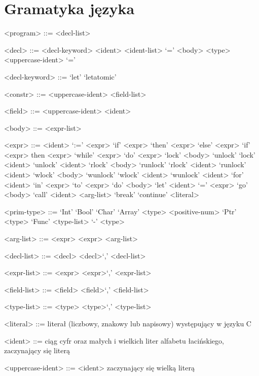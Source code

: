 \documentclass{documentation}
\begin{document}
\section{Gramatyka języka}
\begin{grammar}

<program> ::= <decl-list>

<decl> ::= <decl-keyword> <ident> <ident-list> `=' <body>
\alt <type> <uppercase-ident> `=' 

<decl-keyword> ::= `let' \alt `letatomic'

<constr> ::= <uppercase-ident> <field-list>

<field> ::= <uppercase-ident> <ident>

<body> ::= <expr-list>

<expr> ::= <ident> `:=' <expr>
\alt `if' <expr> `then' <expr> `else' <expr>
\alt `if' <expr> then <expr>
\alt `while' <expr> `do' <expr>
\alt `lock' <body> `unlock'
\alt `lock' <ident>
\alt `unlock' <ident>
\alt `rlock' <body> `runlock'
\alt `rlock' <ident>
\alt `runlock' <ident>
\alt `wlock' <body> `wunlock'
\alt `wlock' <ident>
\alt `wunlock' <ident>
\alt `for' <ident> `in' <expr> `to' <expr> `do' <body>
\alt `let' <ident> `=' <expr>
\alt `go' <body>
\alt `call' <ident> <arg-list>
\alt `break'
\alt `continue'
\alt <literal>

<prim-type> ::= `Int'
\alt `Bool'
\alt `Char'
\alt `Array' <type> <positive-num>
\alt `Ptr' <type>
\alt `Func' <type-list> `-\>' <type>

<arg-list> ::= <expr>
\alt <expr> <arg-list>

<decl-list> ::= <decl>
\alt <decl>`,' <decl-list>

<expr-list> ::= <expr>
\alt <expr>`,' <expr-list>

<field-list> ::= <field>
\alt <field>`,' <field-list>

<type-list> ::= <type>
\alt <type>`,' <type-list>

<literal> ::= literał (liczbowy, znakowy lub napisowy) występujący w języku C

<ident> ::= ciąg cyfr oraz małych i wielkich liter alfabetu łacińskiego, zaczynający się literą

<uppercase-ident> ::= <ident> zaczynający się wielką literą

\end{grammar}
\end{document}
